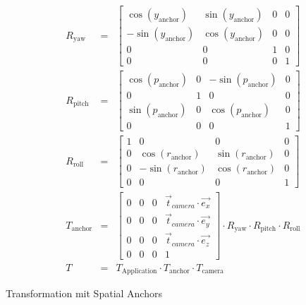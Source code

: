     \begin{floatingequation}[ht!]
        \begin{align}
            R_{\text{yaw}} &=&
            \begin{bmatrix}
                \cos(y_{\text{anchor}})  & \sin(y_{\text{anchor}}) & 0 & 0 \\
                -\sin(y_{\text{anchor}}) & \cos(y_{\text{anchor}}) & 0 & 0 \\
                0                        & 0                       & 1 & 0 \\
                0                        & 0                       & 0 & 1
            \end{bmatrix}\\
            R_{\text{pitch}} &=&
            \begin{bmatrix}
                \cos(p_{\text{anchor}}) & 0 & -\sin(p_{\text{anchor}}) & 0 \\
                0                       & 1 & 0                        & 0 \\
                \sin(p_{\text{anchor}}) & 0 & \cos(p_{\text{anchor}})  & 0 \\
                0                       & 0 & 0                        & 1
            \end{bmatrix}\\
            R_{\text{roll}} &=&
            \begin{bmatrix}
                1 & 0                        & 0                       & 0 \\
                0 & \cos(r_{\text{anchor}})  & \sin(r_{\text{anchor}}) & 0 \\
                0 & -\sin(r_{\text{anchor}}) & \cos(r_{\text{anchor}}) & 0 \\
                0 & 0                        & 0                       & 1
            \end{bmatrix}\\
            T_{\text{anchor}} &=&
            \begin{bmatrix}
                0 & 0 & 0 & \vec{t}_{camera}\cdot\vec{e_x} \\
                0 & 0 & 0 & \vec{t}_{camera}\cdot\vec{e_y} \\
                0 & 0 & 0 & \vec{t}_{camera}\cdot\vec{e_z} \\
                0 & 0 & 0 & 1
            \end{bmatrix}
            \cdot R_{\text{yaw}}\cdot R_{\text{pitch}}\cdot R_{\text{roll}}\\
            T &=& T_{\text{Application}}\cdot T_{\text{anchor}}\cdot T_{\text{camera}}
        \end{align}
        \caption{Transformation mit Spatial Anchors}
        \label{eq:spatial-camera-transformation}
    \end{floatingequation}

